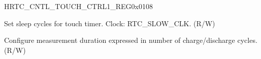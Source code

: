 \begin{register}{H}{RTC\_CNTL\_TOUCH\_CTRL1\_REG}{0x{}0108}\label{regdesc:RTCCNTLRTCTOUCHCTRL1REG}
%
%
\regnewline%
\begin{regdesc}\begin{reglist}
\label{fielddesc:RTCCNTLTOUCHSLEEPCYCLES}\item [RTC\_CNTL\_TOUCH\_SLEEP\_CYCLES] Set sleep cycles for touch timer. Clock: RTC\_SLOW\_CLK. (R/W)
\label{fielddesc:RTCCNTLTOUCHMEASNUM}\item [RTC\_CNTL\_TOUCH\_MEAS\_NUM] Configure measurement duration expressed in number of charge/discharge cycles. (R/W)
\end{reglist}\end{regdesc}
\end{register}


